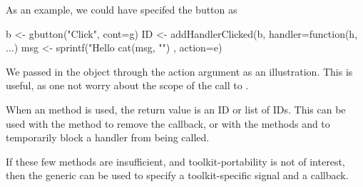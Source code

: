 As an example, we could have specifed the button as
\begin{Schunk}
\begin{Sinput}
 b <- gbutton("Click", cont=g)
 ID <- addHandlerClicked(b, handler=function(h, ...) {
   msg <- sprintf("Hello %
   cat(msg, "\n")
 }, action=e)
\end{Sinput}
\end{Schunk}
We passed in the object  through the action argument as an
illustration. This is useful, as one not worry about the scope of the
call to .

When an  method is used, the return value is an ID
or list of IDs. This can be used with the method 
to remove the callback, or with the methods  and
 to temporarily block a handler from being
called.

If these few methods are insufficient, and toolkit-portability is not
of interest, then the  generic can be used to specify
a toolkit-specific signal and a callback.


